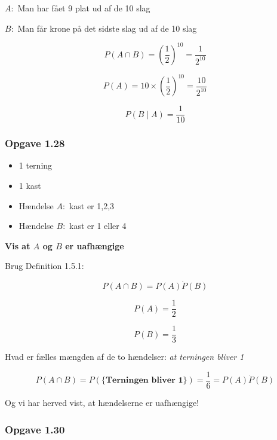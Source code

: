 $A:$ Man har fået 9 plat ud af de 10 slag

$B:$ Man får krone på det sidste slag ud af de 10 slag

\begin{equation}
    P(A \cap B) = (\frac{1}{2})^{10} = \frac{1}{2^{10}}
\end{equation}

\begin{equation}
    P(A) = 10 \times (\frac{1}{2})^{10} = \frac{10}{2^{10}}
\end{equation}

\begin{equation}
    P(B \mid A) = \frac{1}{10}
\end{equation}

\subsubsection{Opgave 1.28}

\begin{itemize}
    \item 1 terning
    \item 1 kast
    \item Hændelse $A:$ kast er 1,2,3
    \item Hændelse $B:$ kast er 1 eller 4
\end{itemize}

\textbf{Vis at $A$ og $B$ er uafhængige}

Brug Definition 1.5.1: 

\begin{equation}
    P(A \cap B) = P(A) \dot P(B)
\end{equation}

\begin{equation}
    P(A) = \frac{1}{2}    
\end{equation}

\begin{equation}
    P(B) = \frac{1}{3}
\end{equation}

Hvad er fælles mængden af de to hændelser: \textit{at terningen bliver 1}

\begin{equation}
    P(A \cap B) = P(\{\textbf{Terningen bliver 1} \}) = \frac{1}{6} = P(A) \dot P(B)
\end{equation}

Og vi har herved vist, at hændelserne er uafhængige!

\subsubsection{Opgave 1.30}

